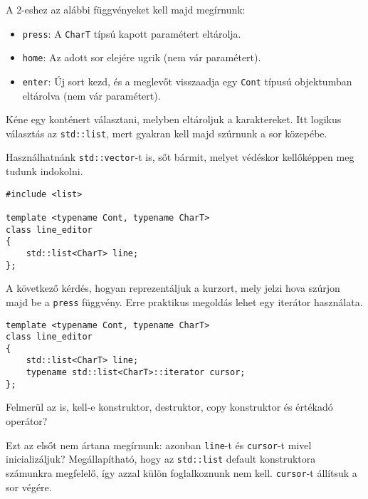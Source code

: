 \documentclass[a4paper,11.5pt,table]{article}
\begin{document}
	A 2-eshez az alábbi függvényeket kell majd megírnunk:
	\begin{itemize}
		\item \texttt{press}: A \texttt{CharT} típsú kapott paramétert eltárolja.
		\item \texttt{home}: Az adott sor elejére ugrik (nem vár paramétert).
		\item \texttt{enter}: Új sort kezd, és a meglevőt visszaadja egy \texttt{Cont} típusú objektumban eltárolva (nem vár paramétert).
	\end{itemize}
	Kéne egy konténert választani, melyben eltároljuk a karaktereket. Itt logikus választás az \texttt{std::list}, mert gyakran kell majd szúrnunk a sor közepébe.
	\begin{note}
		Használhatnánk \texttt{std::vector}-t is, sőt bármit, melyet védéskor kellőképpen meg tudunk indokolni.
	\end{note}
\begin{lstlisting}
#include <list>

template <typename Cont, typename CharT>
class line_editor
{
	std::list<CharT> line;
};
\end{lstlisting}
	A következő kérdés, hogyan reprezentáljuk a kurzort, mely jelzi hova szúrjon majd be a \texttt{press} függvény. Erre praktikus megoldás lehet egy iterátor használata.

\begin{lstlisting}
template <typename Cont, typename CharT>
class line_editor
{
	std::list<CharT> line;
	typename std::list<CharT>::iterator cursor;
};
\end{lstlisting}
	Felmerül az is, kell-e konstruktor, destruktor, copy konstruktor és értékadó operátor? 
	
	Ezt az elsőt nem ártana megírnunk: azonban \texttt{line}-t és \texttt{cursor}-t mivel inicializáljuk? Megállapítható, hogy az \texttt{std::list} default konstruktora számunkra megfelelő, így azzal külön foglalkoznunk nem kell. \texttt{cursor}-t állítsuk a sor végére.
	
\end{document}
